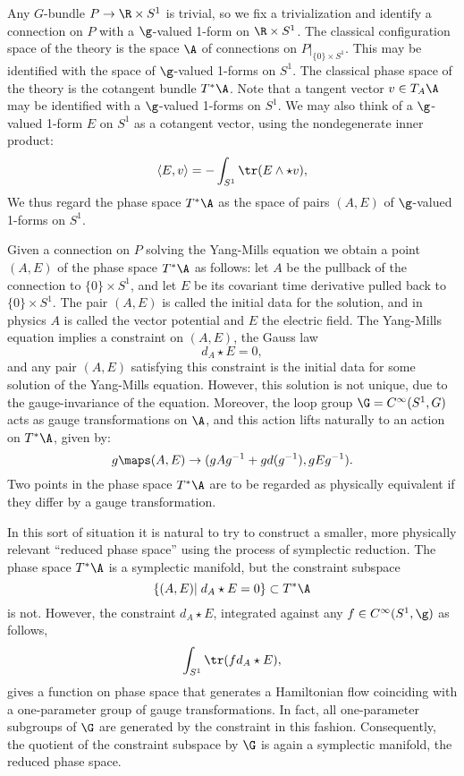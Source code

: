Any $G$-bundle $P \to \R \times S^1$ is trivial, so we fix a
trivialization and identify a connection on $P$
with a $\g$-valued 1-form on $\R \times S^1$.
The classical configuration space of the theory is the space $\A$ of
connections on $P|_{\{0\} \times S^1}$.  This may be identified with the
space of $\g$-valued 1-forms on $S^1$.   The classical phase space of the
theory is the cotangent bundle $T^\ast \A$.  Note that a tangent vector
$v \in T_A\A$ may be identified with a $\g$-valued 1-forms on
$S^1$.  We may also think of a $\g$-valued 1-form $E$ on $S^1$
as a cotangent vector, using the nondegenerate inner product:
\[         \langle E,v\rangle = - \int_{S^1} \tr(E \wedge \star v) ,\]
We thus regard the
phase space $T^\ast \A$ as the space of pairs $(A,E)$ of $\g$-valued
1-forms on $S^1$.

Given a connection on $P$ solving the Yang-Mills equation we obtain a
point $(A,E)$ of the phase space $T^\ast \A$ as follows: let $A$ be the
pullback of the connection to $\{0\} \times S^1$, and let $E$ be its
covariant time derivative pulled back to $\{0\} \times S^1$.
The pair $(A,E)$ is called the initial data for the solution, and
in physics $A$ is called the vector potential and $E$ the electric field.
The Yang-Mills equation implies a constraint on $(A,E)$, the Gauss law
\[         d_A \star E = 0,\]
and any pair $(A,E)$ satisfying this constraint is the initial data for
some solution of the Yang-Mills equation.    However, this solution is not
unique, due to the gauge-invariance of the equation.  Moreover, the loop
group $\G = C^\infty(S^1,G)$ acts as
gauge transformations on $\A$, and this action lifts naturally to an action on
$T^\ast \A$, given by:
\[       g \maps (A,E) \to (gAg^{-1} + gd(g^{-1}), gEg^{-1}) . \]
Two points in the phase space $T^\ast \A$
are to be regarded as physically equivalent if they differ by
a gauge transformation.

In this sort of situation it is natural to try to construct a smaller, more
physically relevant ``reduced phase space'' using the process of symplectic
reduction.  The phase space $T^\ast \A$ is a symplectic manifold, but the
constraint subspace
\[       \{ (A,E) \vert\;  d_A \star E = 0\} \subset
T^\ast \A   \]
is not.  However, the constraint $d_A \star E$, integrated
against any $f \in C^\infty(S^1,\g)$ as follows,
\[        \int_{S^1} \tr(fd_A \star E) ,\]
gives a function on phase space that generates a Hamiltonian flow
coinciding with a one-parameter group of gauge
transformations.  In fact, all one-parameter subgroups of $\G$ are
generated by the constraint in this fashion.  Consequently,
the quotient of the constraint subspace by $\G$ is again a
symplectic manifold, the reduced phase space.

